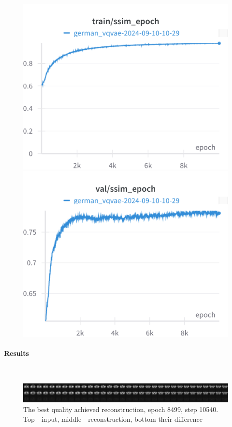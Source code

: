 \begin{figure}[H]
\includegraphics[width=\linewidth]{detailed_engineering/German VQVAE/charts/train_ssim.png}
\caption{}
\endminipage\hfill
{}
\includegraphics[width=\linewidth]{detailed_engineering/German VQVAE/charts/val_ssim.png}
\caption{}
\endminipage
\end{figure}




\paragraph{Results}\mbox{}\\

\begin{figure}[H]
    \centering
    \includegraphics[width=\linewidth]{detailed_engineering/German VQVAE/charts/best_german_vqvae.png}
    \caption{The best quality achieved reconstruction, epoch 8499, step 10540. Top - input, middle - reconstruction, bottom their difference}
    \label{fig:german_vqvae_best}
\end{figure}

